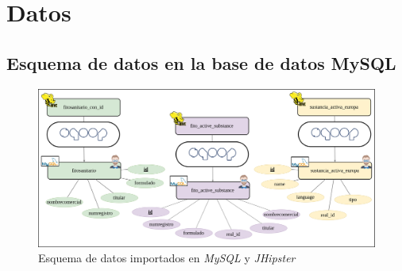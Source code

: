 \chapter{Datos} \label{a.datos}





\begin{landscape}
\section{Esquema de datos en la base de datos MySQL} \label{a.datos.modelo}
\begin{figure}[h!]
    
    \includegraphics[width=1.5\textwidth]{Imagenes/datosmysql}
    \caption{Esquema de datos importados en \textit{MySQL} y \textit{JHipster}}
    \label{fig:datosmysql}
\end{figure}

\end{landscape}
